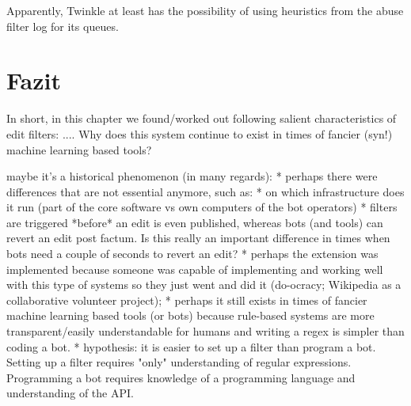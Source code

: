 Apparently, Twinkle at least has the possibility of using heuristics from the abuse filter log for its queues.

\section{Fazit}

In short, in this chapter we found/worked out following salient characteristics of edit filters: ....
Why does this system continue to exist in times of fancier (syn!) machine learning based tools?


maybe it's a historical phenomenon (in many regards):
* perhaps there were differences that are not essential anymore, such as:
  * on which infrastructure does it run (part of the core software vs own computers of the bot operators)
  * filters are triggered *before* an edit is even published, whereas bots (and tools) can revert an edit post factum. Is this really an important difference in times when bots need a couple of seconds to revert an edit?
* perhaps the extension was implemented because someone was capable of implementing and working well with this type of systems so they just went and did it (do-ocracy; Wikipedia as a collaborative volunteer project);
* perhaps it still exists in times of fancier machine learning based tools (or bots) because rule-based systems are more transparent/easily understandable for humans and writing a regex is simpler than coding a bot.
* hypothesis: it is easier to set up a filter than program a bot. Setting up a filter requires "only" understanding of regular expressions. Programming a bot requires knowledge of a programming language and understanding of the API.

